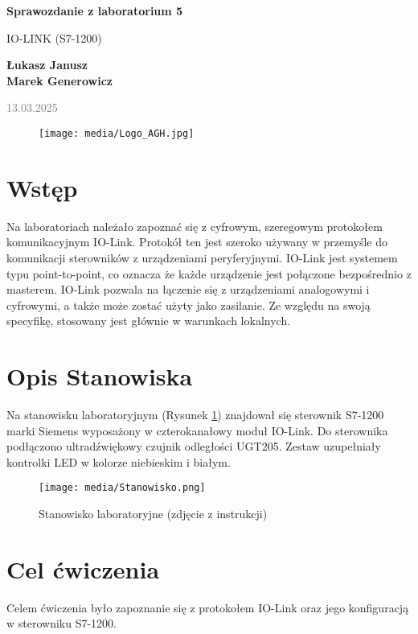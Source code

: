 \documentclass{article}
\begin{document}
\begin{titlepage}
    \begin{center}
        \vspace*{1cm}
            
        \Huge
        \textbf{Sprawozdanie z laboratorium 5}
            
        \vspace{0.5cm}
        \LARGE
        IO-LINK (S7-1200) 
            
        \vspace{1.5cm}
            
        \textbf{Łukasz Janusz\\Marek Generowicz}

        \normalsize      
        \textcolor{gray}{13.03.2025}
        \vfill
        \begin{figure}[hb]
            \centering
            \texttt{[image: media/Logo\_AGH.jpg]}
        \end{figure}   
    \end{center}
\end{titlepage}

\section{Wstęp}
Na laboratoriach należało zapoznać się z cyfrowym, szeregowym protokołem komunikacyjnym IO-Link. Protokół ten jest szeroko używany w przemyśle do komunikacji sterowników z urządzeniami peryferyjnymi. IO-Link jest systemem typu point-to-point, co oznacza że każde urządzenie jest połączone bezpośrednio z masterem. IO-Link pozwala na łączenie się z urządzeniami analogowymi i cyfrowymi, a także może zostać użyty jako zasilanie. Ze względu na swoją specyfikę, stosowany jest głównie w warunkach lokalnych. 

\section{Opis Stanowiska}
Na stanowisku laboratoryjnym (Rysunek \ref{fig:stanowisko}) znajdował się sterownik S7-1200 marki Siemens wyposażony w czterokanałowy moduł IO-Link. Do sterownika podłączono ultradźwiękowy czujnik odległości UGT205. Zestaw uzupełniały kontrolki LED w kolorze niebieskim i białym. 
\begin{figure}[H]
    \centering
    \texttt{[image: media/Stanowisko.png]}
    \caption{Stanowisko laboratoryjne (zdjęcie z instrukcji)}
    \label{fig:stanowisko}
\end{figure}

\section{Cel ćwiczenia}

Celem ćwiczenia było zapoznanie się z protokołem IO-Link oraz jego konfiguracją w sterowniku S7-1200. 
\end{document}
